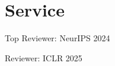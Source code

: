 \documentclass[a4paper,20pt]{article}
\begin{document}
\section{Service}
\begin{description}[font=$\bullet$]
\item {Top Reviewer: NeurIPS 2024}
\vspace{-5pt}
\item {Reviewer: ICLR 2025}
\end{description}
\end{document}
